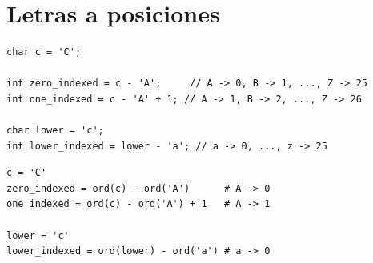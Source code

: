 \section{Letras a posiciones}

\begin{lstlisting}[style=cpp]
char c = 'C';

int zero_indexed = c - 'A';     // A -> 0, B -> 1, ..., Z -> 25
int one_indexed = c - 'A' + 1; // A -> 1, B -> 2, ..., Z -> 26

char lower = 'c';
int lower_indexed = lower - 'a'; // a -> 0, ..., z -> 25
\end{lstlisting}

\begin{lstlisting}[style=py]
c = 'C'
zero_indexed = ord(c) - ord('A')      # A -> 0
one_indexed = ord(c) - ord('A') + 1   # A -> 1

lower = 'c'
lower_indexed = ord(lower) - ord('a') # a -> 0
\end{lstlisting}